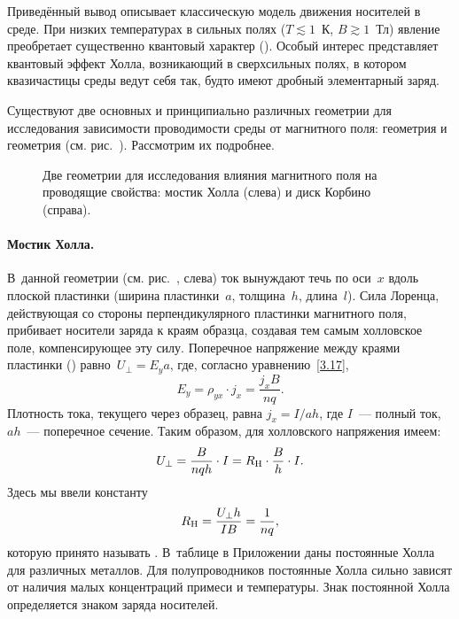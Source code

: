 \begin{lab:note}
Приведённый вывод описывает классическую модель движения носителей
в среде. При низких температурах  в сильных полях ($T\lesssim 1$~К, $B\gtrsim1$~Тл)
явление преобретает существенно квантовый характер
(). Особый интерес представляет
 квантовый эффект Холла, возникающий в сверхсильных полях,
в котором квазичастицы среды ведут себя так, будто имеют
дробный элементарный заряд.
\end{lab:note}



Существуют две основных и принципиально различных геометрии для исследования
зависимости проводимости среды от магнитного поля: геометрия  и геометрия  (см. рис.~).
Рассмотрим их подробнее.

\begin{figure}[h!]
\centering
    \caption{Две геометрии для исследования влияния магнитного поля на
проводящие свойства: мостик Холла (слева) и диск Корбино (справа).}
\end{figure}

\paragraph{Мостик Холла.}
В~данной геометрии (см. рис.~, слева) ток вынуждают течь по
оси~$x$ вдоль плоской пластинки (ширина пластинки~$a$, толщина~$h$,
длина~$l$).
Сила Лоренца, действующая со стороны перпендикулярного
пластинки магнитного поля, прибивает носители заряда к краям образца,
создавая тем самым холловское поле, компенсирующее эту силу.
Поперечное напряжение между краями пластинки
() равно~$U_{\perp}=E_ya$,
где, согласно уравнению~\eqref{3.17},
\[
E_y=\rho_{yx}\cdot j_x=\frac{j_x B}{nq}.
\]
Плотность тока, текущего через образец, равна $j_x=I/ah$, где $I$~---
полный ток, $ah$~--- поперечное сечение.
Таким образом, для холловского напряжения имеем:
\begin{equation}
    U_{\perp}=\frac{B}{nqh}\cdot I =R_{\rm H}\cdot \frac{B}{h}\cdot I .
    \eqmark{3.19}
\end{equation}
Здесь мы ввели константу
\begin{equation}
    R_{\rm H}= \frac{U_{\perp}h}{IB} = \frac{1}{nq},
    \eqmark{HallConstant}
\end{equation}
которую принято называть . В~таблице в Приложении даны
постоянные Холла для различных металлов. Для полупроводников постоянные Холла
сильно зависят от наличия малых концентраций примеси и температуры.
Знак постоянной Холла определяется знаком заряда носителей.

